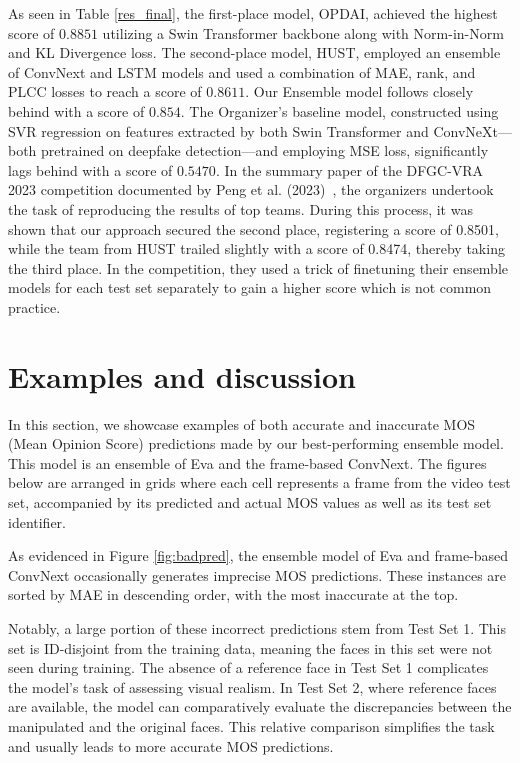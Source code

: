 \documentclass[a4paper,12pt,openright]{book}
\begin{document}
As seen in Table \ref{res_final}, the first-place model, OPDAI, achieved the highest score of \(0.8851\) utilizing a Swin Transformer backbone along with Norm-in-Norm and KL Divergence loss. The second-place model, HUST, employed an ensemble of ConvNext and LSTM models and used a combination of MAE, rank, and PLCC losses to reach a score of \(0.8611\). Our Ensemble model follows closely behind with a score of \(0.854\). The Organizer's baseline model, constructed using SVR regression on features extracted by both Swin Transformer and ConvNeXt—both pretrained on deepfake detection—and employing MSE loss, significantly lags behind with a score of \(0.5470\). In the summary paper of the DFGC-VRA 2023 competition documented by Peng et al. (2023)~\cite{peng_etal_2023}, the organizers undertook the task of reproducing the results of top teams. During this process, it was shown that our approach secured the second place, registering a score of 0.8501, while the team from HUST trailed slightly with a score of 0.8474, thereby taking the third place. In the competition, they used a trick of finetuning their ensemble models for each test set separately to gain a higher score which is not common practice.







\newpage

\section{Examples and discussion}
In this section, we showcase examples of both accurate and inaccurate MOS (Mean Opinion Score) predictions made by our best-performing ensemble model. This model is an ensemble of Eva and the frame-based ConvNext. The figures below are arranged in grids where each cell represents a frame from the video test set, accompanied by its predicted and actual MOS values as well as its test set identifier.

As evidenced in Figure \ref{fig:badpred}, the ensemble model of Eva and frame-based ConvNext occasionally generates imprecise MOS predictions. These instances are sorted by MAE in descending order, with the most inaccurate at the top.

Notably, a large portion of these incorrect predictions stem from Test Set 1. This set is ID-disjoint from the training data, meaning the faces in this set were not seen during training. The absence of a reference face in Test Set 1 complicates the model's task of assessing visual realism. In Test Set 2, where reference faces are available, the model can comparatively evaluate the discrepancies between the manipulated and the original faces. This relative comparison simplifies the task and usually leads to more accurate MOS predictions.
\end{document}
